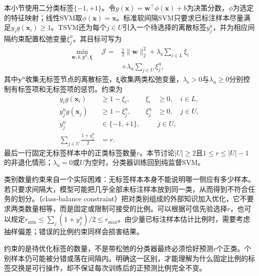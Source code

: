 本小节使用二分类标签$\{-1,+1\}$。令$g(\bm{x})=\bm{w}^{\top}\phi(\bm{x})+b$为决策分数，$\phi$为选定的特征映射；线性SVM取$\phi(\bm{x})=\bm{x}$。标准软间隔SVM只要求已标注样本尽量满足$y_i g(\bm{x}_i)\geq1$。TSVM还为每个$j\in U$引入一个待选择的离散标签$y_j^{\mathrm{u}}$，并为相应间隔约束配置松弛变量$\xi_j^{\mathrm{u}}$。其目标可写为
\begin{equation}
  \label{eq:classification-tsvm-objective}
  \begin{aligned}
    \min_{\bm{w},b,\bm{y}^{\mathrm{u}},\bm{\xi}}\quad
    \mathcal{J}
      ={}&\frac12\lVert\bm{w}\rVert_2^2
         +\lambda_{\mathrm{s}}\sum_{i\in L}\xi_i\\
       &+\lambda_{\mathrm{u}}\sum_{j\in U}\xi_j^{\mathrm{u}},
  \end{aligned}
\end{equation}
其中$\bm{y}^{\mathrm{u}}$收集无标签节点的离散标签，$\bm{\xi}$收集两类松弛变量，$\lambda_{\mathrm{s}}>0$与$\lambda_{\mathrm{u}}\geq0$分别控制有标签项和无标签项的惩罚。约束为
\begin{equation}
  \label{eq:classification-tsvm-constraints}
  \begin{aligned}
    y_i g(\bm{x}_i)&\geq1-\xi_i,
      &\xi_i&\geq0,\quad i\in L,\\
    y_j^{\mathrm{u}}g(\bm{x}_j)&\geq1-\xi_j^{\mathrm{u}},
      &\xi_j^{\mathrm{u}}&\geq0,\quad j\in U,\\
    y_j^{\mathrm{u}}&\in\{-1,+1\},
      &&j\in U,\\
    \sum_{j\in U}\frac{1+y_j^{\mathrm{u}}}{2}&=r.
  \end{aligned}
\end{equation}
最后一行固定无标签样本中的正类标签数量$r$。本节讨论$|U|\geq2$且$1\leq r\leq|U|-1$的非退化情形；$\lambda_{\mathrm{u}}=0$或$U$为空时，分类器训练回到纯监督SVM。

类别数量约束来自一个实际困难：无标签样本本身不能说明哪一侧应有多少样本。若只要求间隔大，模型可能把几乎全部未标注样本放到同一类，从而得到不符合任务的划分。（class-balance constraint）把对类别组成的外部知识加入优化，它不要求两类数量相等，而是固定或限制可接受的比例。可以根据可信先验选择$r$，也可以规定$r_{\min}\leq\sum_j(1+y_j^{\mathrm{u}})/2\leq r_{\max}$。由少量已标注样本估计比例时，需要考虑抽样偏差；错误的比例约束同样会损害结果。

约束的是待优化标签的数量，不是带松弛的分类器最终必须恰好预测$r$个正类。个别样本仍可能被分错或落在间隔内。明确这一区别，才能理解为什么固定比例的标签交换是可行操作，却不保证每次训练后的正预测比例完全不变。

